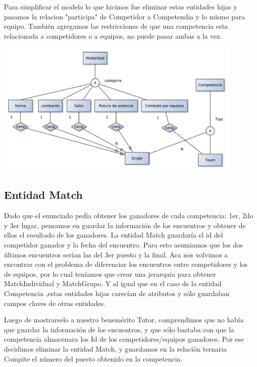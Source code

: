 Para simplificar el modelo lo que hicimos fue eliminar estas entidades hijas y pasamos la relacion "participa" de Competidor a Competendia y lo mismo para equipo. También agregamos las restricciones de que una competencia esta relacionada a competidores o a equipos, no puede pasar ambas a la vez.

\begin{center}
\includegraphics[width=12cm,keepaspectratio]{./imagenes/des1.pdf}\newline
\end{center}

\subsection{Entidad Match}

Dado que el enunciado ped\'ia obtener los ganadores de cada competencia: 1er, 2do y 3er lugar, pensamos en guardar la informaci\'on de los encuentros y obtener de ellos el resultado de los ganadores. La entidad Match guardar\'ia el id del competidor ganador y la fecha del encuentro. Para esto asumiamos que los dos \'ultimos encuentros ser\'ian las del 3er puesto y la final. Aca nos volvimos a encontrar con el problema de diferenciar los encuentros entre competidores y los de equipos, por lo cual teníamos que crear una jerarquía para obtener MatchIndividual y MatchGrupo. Y al igual que en el caso de la entidad Competencia ,estas entidades hijas carecían de atributos y s\'olo guardaban campos claves de otras entidades.

Luego de mostrarselo a nuestro benemérito Tutor, comprendimos que no había que guardar la información de los encuentros, y que s\'olo bastaba con que la competencia almacenara los Id de los competidores/equipos ganadores. Por ese decidimos eliminar la entidad Match, y guardamos en la relaci\'on ternaria Compite el n\'umero del puesto obtenido en la competencia.

